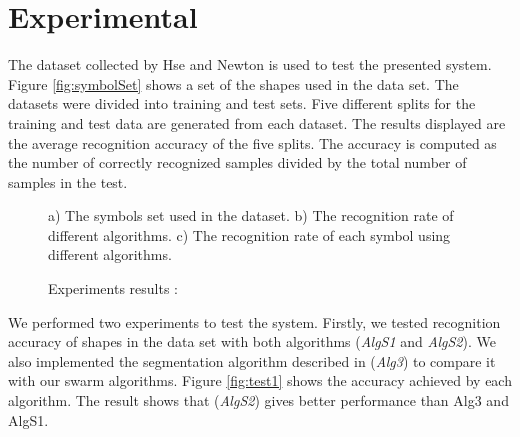 \documentclass{article}
\begin{document}
\section{Experimental}
\label{sec:Experiments}
 
The dataset collected by Hse and Newton\cite{HeloiseBeautification} is used to test the presented system.  Figure \ref{fig:symbolSet} shows a set of the shapes used in the data set. The datasets were divided into training and test sets. Five different splits for the training and test data are generated from each dataset. The results displayed are the average recognition accuracy of the five splits. The accuracy is computed as the number of correctly recognized samples divided by the total number of samples in the test.
 \begin{figure*}[]
	\centering
	\begin{minipage}[b]{5cm}	
\begin{center}
		
		\end{center}
		\end{minipage}
		\hfill
	\caption{Experiments results :} a) The symbols set used in the dataset.   b) The recognition rate of different algorithms.  c) The recognition rate of each symbol using different algorithms. 
\end{figure*} 
We performed two experiments to test the system. Firstly, we tested recognition accuracy of shapes in the data set with both algorithms (\textsl{AlgS1} and \textsl{AlgS2}). We also implemented the segmentation algorithm described in \cite{earlyprocess} (\textsl{Alg3}) to compare it with our swarm algorithms. Figure \ref{fig:test1} shows the accuracy achieved by each algorithm. The result shows that (\textsl{AlgS2}) gives better performance than Alg3 and AlgS1. 
\end{document}
